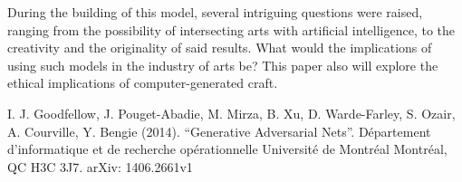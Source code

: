 \documentclass[conference]{IEEEtran}
\begin{document}
    During the building of this model, several intriguing questions were raised, ranging from the possibility of intersecting
arts with artificial intelligence, to the creativity and the originality of said results. What would the implications of using
such models in the industry of arts be? This paper also will explore the ethical implications of computer-generated craft.

\begin{thebibliography}{00}
     I. J. Goodfellow, J. Pouget-Abadie, M. Mirza, B. Xu, D. Warde-Farley, S. Ozair, A. Courville, Y. Bengie
    (2014). ``Generative Adversarial Nets''. Département d'informatique et de recherche opérationnelle Université de Montréal
    Montréal, QC H3C 3J7. arXiv: 1406.2661v1
\end{thebibliography}
\end{document}
